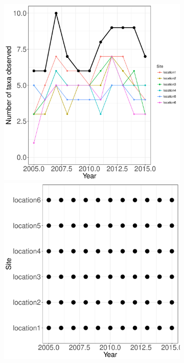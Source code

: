 \documentclass[11pt, oneside]{article}
\begin{document}
\begin{figure}[h!]
\begin{figure}[h!]
\includegraphics[scale = 0.4]{mcr-inverts-castorani_num_taxa_over_time.pdf}
\includegraphics[scale = 0.4]{mcr-inverts-castorani_spatiotemporal_sampling_effort.pdf}

\end{figure}
\end{figure}
\end{document}
